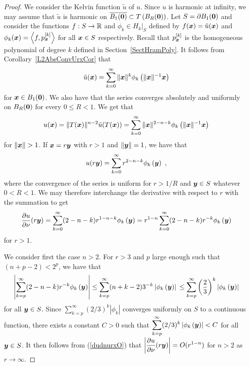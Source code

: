 \begin{proof}
We consider the Kelvin function $\tilde{u}$ of $u$.  Since $u$ is
harmonic at infinity, we may assume that
$\tilde{u}$ is harmonic on
$\displaystyle \overline{B_1({\bm{0}})} \subset T\left(B_R({\bm{0}})\right)$.
Let $S = \partial B_1({\bm{0}})$ and consider the functions $f: S \to \mathbb{R}$
and $\displaystyle \phi_k \in H_k\big|_S$ defined by
$f({\bm{x}}) = \tilde{u}({\bm{x}})$ and
$\phi_k({\bm{x}}) = \left\langle{f} , {p_{{\bm{x}}}^{[k]}}\right\rangle$ for all ${\bm{x}} \in S$
respectively.  Recall that $\displaystyle p_{{\bm{x}}}^{[k]}$ is the
homogeneous polynomial of degree $k$ defined in Section~\ref{SectHramPoly}.
It follows from Corollary~\ref{L2AbsConvUrxCor} that
\[
\tilde{u}({\bm{x}}) = \sum_{k=0}^\infty \|{\bm{x}}\|^k
\phi_k\left(\|{\bm{x}}\|^{-1}{\bm{x}}\right)
\]
for ${\bm{x}} \in B_1({\bm{0}})$.  We also have that the
series converges absolutely and uniformly on $B_R({\bm{0}})$ for every
$0 \leq R <1$.   We get that
\[
u({\bm{x}}) = \|T({\bm{x}})\|^{n-2} \tilde{u}(T({\bm{x}}))  
= \sum_{k=0}^\infty \|{\bm{x}}\|^{2-n-k}
\phi_k\left(\|{\bm{x}}\|^{-1} {\bm{x}}\right)
\]
for $\|{\bm{x}}\| > 1$.  If
${\bm{x}} = r {\bm{y}}$ with $r > 1$ and $\|{\bm{y}}\|=1$, we have that
\[
u(r{\bm{y}}) = \sum_{k=0}^\infty r^{2-n-k} \phi_k\left({\bm{y}}\right) \ ,
\]
where the convergence of the series is uniform for $r>1/R$ and
${\bm{y}} \in S$ whatever $0 < R < 1$.  We may therefore interchange
the derivative with respect to $r$ with the summation to get
\begin{equation} \label{dudnurxO}
\frac{\partial{u}}{\partial \nu}(r {\bm{y}})
= \sum_{k=0}^\infty (2-n-k) r^{1-n-k} \phi_k\left({\bm{y}}\right)
= r^{1-n} \sum_{k=0}^\infty (2-n-k) r^{-k} \phi_k\left({\bm{y}}\right)
\end{equation}
for $r>1$.

 We consider first the case $n>2$.  For $r>3$ and $p$ large
enough such that $\displaystyle (n+p-2) < 2^p$, we have that
\[
\left| \sum_{k=p}^{\infty} (2-n-k) r^{-k} \phi_k\left({\bm{y}}\right) \right|
\leq \sum_{k=p}^{\infty} (n+k-2) 3^{-k}
\left| \phi_k\left({\bm{y}}\right) \right| \\
\leq \sum_{k=p}^{\infty} \left(\frac{2}{3}\right)^k
\left| \phi_k\left({\bm{y}}\right) \right|
\]
for all ${\bm{y}} \in S$.  Since
$\displaystyle \sum_{k=p}^{\infty} (2/3)^k |\phi_k|$
converges uniformly on $S$ to a continuous function, there exists a
constant $C>0$ such that
$\displaystyle \sum_{k=p}^{\infty} (2/3)^k \left|
  \phi_k\left({\bm{y}}\right) \right| < C$
for all ${\bm{y}} \in S$.  It then follows
from (\ref{dudnurxO}) that
$\displaystyle \left| \frac{\partial{u}}{\partial \nu}(r {\bm{y}}) \right| = O(r^{1-n})$
for $n>2$ as $r \to \infty$.


\end{proof}
